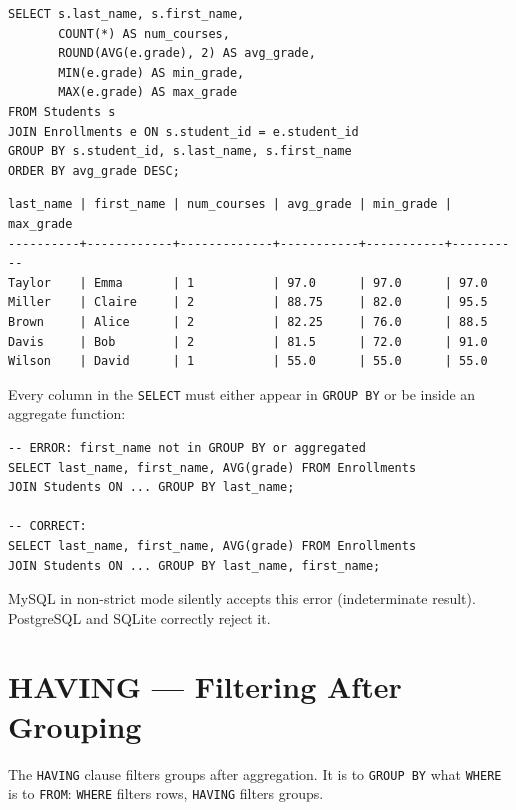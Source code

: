 \begin{codeblock}[title=\textbf{Average per Student}]
\begin{verbatim}
SELECT s.last_name, s.first_name,
       COUNT(*) AS num_courses,
       ROUND(AVG(e.grade), 2) AS avg_grade,
       MIN(e.grade) AS min_grade,
       MAX(e.grade) AS max_grade
FROM Students s
JOIN Enrollments e ON s.student_id = e.student_id
GROUP BY s.student_id, s.last_name, s.first_name
ORDER BY avg_grade DESC;
\end{verbatim}
\end{codeblock}

\begin{codeoutput}
\begin{verbatim}
last_name | first_name | num_courses | avg_grade | min_grade | max_grade
----------+------------+-------------+-----------+-----------+----------
Taylor    | Emma       | 1           | 97.0      | 97.0      | 97.0
Miller    | Claire     | 2           | 88.75     | 82.0      | 95.5
Brown     | Alice      | 2           | 82.25     | 76.0      | 88.5
Davis     | Bob        | 2           | 81.5      | 72.0      | 91.0
Wilson    | David      | 1           | 55.0      | 55.0      | 55.0
\end{verbatim}
\end{codeoutput}

\begin{antipattern}[title=\textbf{Column Outside GROUP BY Without Aggregation}]
Every column in the \texttt{SELECT} must either appear in \texttt{GROUP BY}
or be inside an aggregate function:
\begin{verbatim}
-- ERROR: first_name not in GROUP BY or aggregated
SELECT last_name, first_name, AVG(grade) FROM Enrollments
JOIN Students ON ... GROUP BY last_name;

-- CORRECT:
SELECT last_name, first_name, AVG(grade) FROM Enrollments
JOIN Students ON ... GROUP BY last_name, first_name;
\end{verbatim}
MySQL in non-strict mode silently accepts this error (indeterminate result).
PostgreSQL and SQLite correctly reject it.
\end{antipattern}

\section{HAVING --- Filtering After Grouping}

\begin{definition}[HAVING]
The \texttt{HAVING} clause filters groups after aggregation. It is to
\texttt{GROUP BY} what \texttt{WHERE} is to \texttt{FROM}:
\texttt{WHERE} filters rows, \texttt{HAVING} filters groups.
\end{definition}

